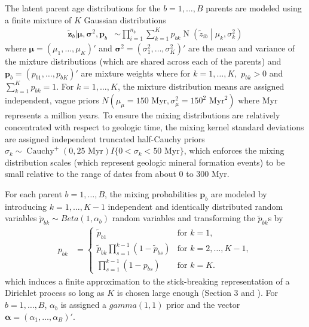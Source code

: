 The latent parent age distributions for the $b = 1, \ldots, B$ parents are modeled using a finite mixture of $K$ Gaussian distributions 
\begin{align*}
\tilde{\mathbf{z}}_b | \boldsymbol{\mu}, \boldsymbol{\sigma}^2, \boldsymbol{p}_{b} & \sim \prod_{i=1}^{n_b} \sum_{k=1}^K p_{bk} \operatorname{N} \left( \tilde{z}_{ib} \middle| \mu_{k}, \sigma^2_{k} \right) 
\end{align*}
where $\boldsymbol{\mu} = (\mu_1, \ldots, \mu_K)'$ and $\boldsymbol{\sigma}^2 = (\sigma^2_1, \ldots, \sigma^2_K)'$ are the mean and variance of the mixture distributions (which are shared across each of the parents) and $\mathbf{p}_{b} = (p_{b1}, \ldots, p_{bK})'$ are mixture weights where for $k = 1, \ldots, K,$ $p_{bk} > 0$ and $\sum_{k=1}^K p_{bk} = 1$. For $k = 1, \ldots, K$, the mixture distribution means are assigned independent, vague priors $N(\mu_\mu = 150 \mbox{ Myr}, \sigma^2_\mu = 150^2 \mbox{ Myr}^2)$ where Myr represents a million years. To ensure the mixing distributions are relatively concentrated with respect to geologic time, the mixing kernel standard deviations are assigned independent truncated half-Cauchy priors $\sigma_k \sim \operatorname{Cauchy}^+(0, 25 \mbox{ Myr})I\{0 < \sigma_k < 50 \mbox{ Myr}\}$, which enforces the mixing distribution scales (which represent geologic mineral formation events) to be small relative to the range of dates from about 0 to 300 Myr.

For each parent $b = 1, \ldots, B$, the mixing probabilities $\mathbf{p}_b$ are modeled by introducing $k = 1, \ldots, K-1$ independent and identically distributed random variables $\tilde{p}_{bk} \sim Beta(1, \alpha_b)$ random variables and transforming the $\tilde{p}_{bk}$s by 
\begin{align*}
p_{b k} & = \begin{cases}
\tilde{p}_{b1} & \mbox{for } k = 1,\\
 \tilde{p}_{bk} \prod_{s=1}^{k-1} (1 - \tilde{p}_{bs}) & \mbox{for } k=2, \ldots, K-1, \\ 
\prod_{s=1}^{k-1} (1 - p_{bs}) & \mbox{for } k = K.
\end{cases}
\end{align*}
which induces a finite approximation to the stick-breaking representation of a Dirichlet process so long as $K$ is chosen large enough (Section 3 \citet{ishwaran2001gibbs} and \citet{ishwaran2002exact}). For $b = 1, \ldots, B$, $\alpha_b$ is assigned a $gamma(1, 1)$ prior and the vector $\boldsymbol{\alpha} = (\alpha_1, \ldots, \alpha_B)'$.

